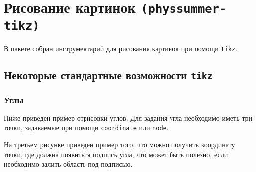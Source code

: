 \section{Рисование картинок \texttt{(physsummer-tikz)}}

В пакете собран инструментарий для рисования картинок при помощи \texttt{tikz}.



\subsection{Некоторые стандартные возможности \texttt{tikz}}

\subsubsection{Углы}

Ниже приведен пример отрисовки углов. Для задания угла необходимо иметь три точки, задаваемые при помощи
\texttt{coordinate} или \texttt{node}.

На третьем рисунке приведен пример того, что можно получить координату точки, где должна появиться
подпись угла, что может быть полезно, если необходимо залить область под подписью.

